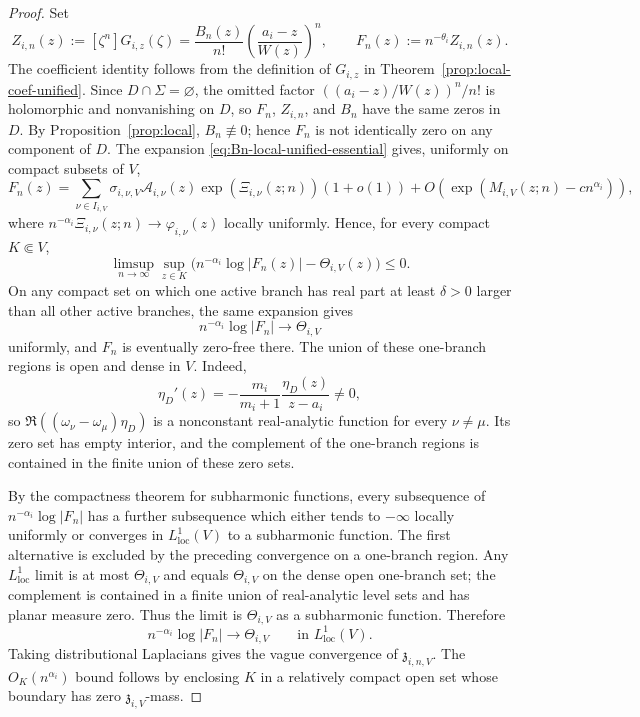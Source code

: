 \documentclass[reqno]{article}
\theoremstyle{definition}
\theoremstyle{remark}
\theoremstyle{plain}
\begin{document}
\begin{proof}
Set
\[
Z_{i,n}(z):=[\zeta^n]G_{i,z}(\zeta)
=\frac{B_n(z)}{n!}\left(\frac{a_i-z}{W(z)}\right)^n,
\qquad
F_n(z):=n^{-\theta_i}Z_{i,n}(z).
\]
The coefficient identity follows from the definition of $G_{i,z}$ in Theorem~\ref{prop:local-coef-unified}. Since $D\cap\Sigma=\varnothing$, the omitted factor $((a_i-z)/W(z))^n/n!$ is holomorphic and nonvanishing on $D$, so $F_n$, $Z_{i,n}$, and $B_n$ have the same zeros in $D$. By Proposition~\ref{prop:local}, \(B_n\not\equiv0\); hence \(F_n\) is not identically zero on any component of \(D\). The expansion \eqref{eq:Bn-local-unified-essential} gives, uniformly on compact subsets of $V$,
\[
F_n(z)=
\sum_{\nu\in I_{i,V}}\sigma_{i,\nu,V}\mathcal A_{i,\nu}(z)\exp(\Xi_{i,\nu}(z;n))(1+o(1))+
O\!\left(\exp(M_{i,V}(z;n)-c n^{\alpha_i})\right),
\]
where $n^{-\alpha_i}\Xi_{i,\nu}(z;n)\to\varphi_{i,\nu}(z)$ locally uniformly. Hence, for every compact $K\Subset V$,
\[
\limsup_{n\to\infty}\sup_{z\in K}\bigl(n^{-\alpha_i}\log|F_n(z)|-\Theta_{i,V}(z)\bigr)\le0.
\]
On any compact set on which one active branch has real part at least $\delta>0$ larger than all other active branches, the same expansion gives
\[
n^{-\alpha_i}\log|F_n|\longrightarrow \Theta_{i,V}
\]
uniformly, and $F_n$ is eventually zero-free there. The union of these one-branch regions is open and dense in $V$. Indeed,
\[
\eta_D'(z)=-\frac{m_i}{m_i+1}\frac{\eta_D(z)}{z-a_i}\ne0,
\]
so $\Re((\omega_\nu-\omega_\mu)\eta_D)$ is a nonconstant real-analytic function for every $\nu\ne\mu$. Its zero set has empty interior, and the complement of the one-branch regions is contained in the finite union of these zero sets.

By the compactness theorem for subharmonic functions, every subsequence of $n^{-\alpha_i}\log|F_n|$ has a further subsequence which either tends to $-\infty$ locally uniformly or converges in $L^1_{\mathrm{loc}}(V)$ to a subharmonic function. The first alternative is excluded by the preceding convergence on a one-branch region. Any $L^1_{\mathrm{loc}}$ limit is at most $\Theta_{i,V}$ and equals $\Theta_{i,V}$ on the dense open one-branch set; the complement is contained in a finite union of real-analytic level sets and has planar measure zero. Thus the limit is $\Theta_{i,V}$ as a subharmonic function. Therefore
\[
n^{-\alpha_i}\log|F_n|\longrightarrow\Theta_{i,V}
\qquad\text{in }L^1_{\mathrm{loc}}(V).
\]
Taking distributional Laplacians gives the vague convergence of $\mathfrak z_{i,n,V}$. The $O_K(n^{\alpha_i})$ bound follows by enclosing $K$ in a relatively compact open set whose boundary has zero $\mathfrak z_{i,V}$-mass.


\end{proof}
\end{document}
